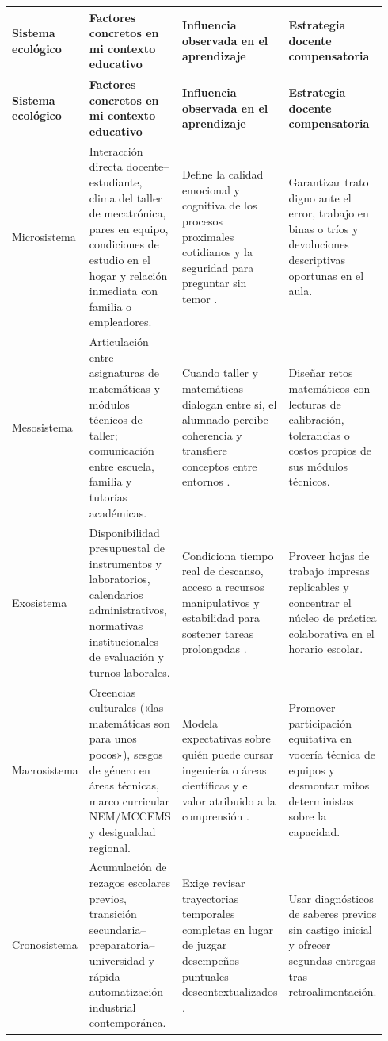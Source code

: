 \documentclass[spanish,letterpaper,oneside]{article}
\begin{document}
{\scriptsize{}\renewcommand{\arraystretch}{1.28}
\begin{longtable}{|>{\raggedright\arraybackslash}p{0.15\linewidth}|>{\raggedright\arraybackslash}p{0.28\linewidth}|>{\raggedright\arraybackslash}p{0.25\linewidth}|>{\raggedright\arraybackslash}p{0.26\linewidth}|}\hline
\rowcolor{iiiepePale} \textbf{Sistema ecológico} & \textbf{Factores concretos en mi contexto educativo} & \textbf{Influencia observada en el aprendizaje} & \textbf{Estrategia docente compensatoria} \\\hline
\endfirsthead
\hline
\rowcolor{iiiepePale} \textbf{Sistema ecológico} & \textbf{Factores concretos en mi contexto educativo} & \textbf{Influencia observada en el aprendizaje} & \textbf{Estrategia docente compensatoria} \\\hline
\endhead
Microsistema & Interacción directa docente--estudiante, clima del taller de mecatrónica, pares en equipo, condiciones de estudio en el hogar y relación inmediata con familia o empleadores. & Define la calidad emocional y cognitiva de los procesos proximales cotidianos y la seguridad para preguntar sin temor \citep{bronfenbrenner1987ecologia}. & Garantizar trato digno ante el error, trabajo en binas o tríos y devoluciones descriptivas oportunas en el aula. \\\hline
Mesosistema & Articulación entre asignaturas de matemáticas y módulos técnicos de taller; comunicación entre escuela, familia y tutorías académicas. & Cuando taller y matemáticas dialogan entre sí, el alumnado percibe coherencia y transfiere conceptos entre entornos \citep{sep2023pensamiento}. & Diseñar retos matemáticos con lecturas de calibración, tolerancias o costos propios de sus módulos técnicos. \\\hline
Exosistema & Disponibilidad presupuestal de instrumentos y laboratorios, calendarios administrativos, normativas institucionales de evaluación y turnos laborales. & Condiciona tiempo real de descanso, acceso a recursos manipulativos y estabilidad para sostener tareas prolongadas \citep{tong2023bioecological}. & Proveer hojas de trabajo impresas replicables y concentrar el núcleo de práctica colaborativa en el horario escolar. \\\hline
Macrosistema & Creencias culturales («las matemáticas son para unos pocos»), sesgos de género en áreas técnicas, marco curricular NEM/MCCEMS y desigualdad regional. & Modela expectativas sobre quién puede cursar ingeniería o áreas científicas y el valor atribuido a la comprensión \citep{unesco2015replantear}. & Promover participación equitativa en vocería técnica de equipos y desmontar mitos deterministas sobre la capacidad. \\\hline
Cronosistema & Acumulación de rezagos escolares previos, transición secundaria--preparatoria--universidad y rápida automatización industrial contemporánea. & Exige revisar trayectorias temporales completas en lugar de juzgar desempeños puntuales descontextualizados \citep{bronfenbrenner2006bioecologico}. & Usar diagnósticos de saberes previos sin castigo inicial y ofrecer segundas entregas tras retroalimentación. \\\hline
\end{longtable}}
\end{document}

